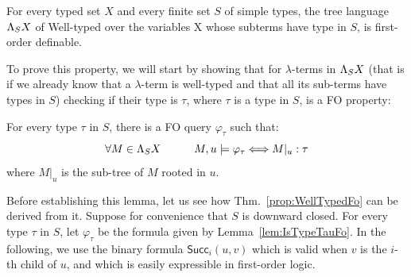 \begin{theorem}\label{prop:WellTypedFo}
    For every typed set $X$ and every finite set $S$ of simple types, the tree language $\Lambda_{S} X$ of Well-typed \lambdaterms over the variables X whose subterms have type in $S$, is first-order definable. 
\end{theorem}

To prove this property, we will start by showing that for $\lambda$-terms in $\Lambda_{S} X$ (that is if we already know that a $\lambda$-term is well-typed and that all its sub-terms have types in $S$) checking if their type is $\tau$, where $\tau$ is a type in $S$, is a FO property:
\begin{lemma}\label{lem:IsTypeTauFo}
For every type $\tau$ in $S$, there is a FO query $\varphi_\tau$ such that:
$$ \forall M\in \Lambda_{S} X \qquad\quad M,u \models \varphi_\tau \Longleftrightarrow M|_u:\tau$$
where $M|_u$ is the sub-tree of $M$ rooted in $u$. 
\end{lemma}
Before establishing this lemma, let us see how Thm.~\ref{prop:WellTypedFo} can be derived from it. Suppose for convenience that $S$ is downward closed. For every type $\tau$ in $S$, let $\varphi_\tau$ be the formula given by Lemma~\ref{lem:IsTypeTauFo}. In the following, we use the binary formula
 $\mathsf{Succ}_{i}(u,v)$ which is valid when $v$ is the $i$-th child of $u$, and which is easily expressible in first-order logic.
 \smallskip
 
